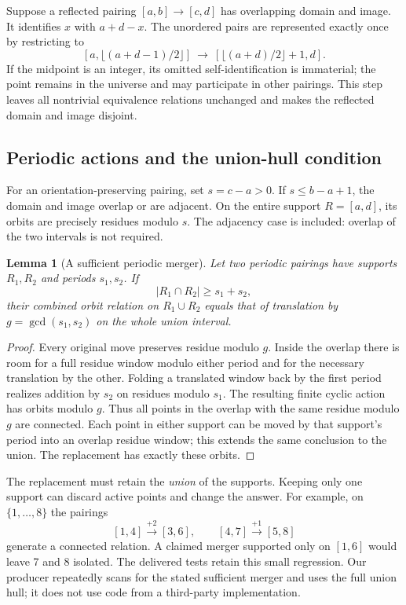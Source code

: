 \documentclass[11pt,a4paper]{article}
\newtheorem{lemma}[theorem]{Lemma}
\theoremstyle{definition}\newtheorem{definition}[theorem]{Definition}
\theoremstyle{remark}\newtheorem{remark}[theorem]{Remark}
\begin{document}
Suppose a reflected pairing $[a,b]\to[c,d]$ has overlapping domain and image.
It identifies $x$ with $a+d-x$. The unordered pairs are represented exactly
once by restricting to
\[
 [a,\lfloor(a+d-1)/2\rfloor]
 \ \longrightarrow\
 [\lfloor(a+d)/2\rfloor+1,d].
\]
If the midpoint is an integer, its omitted self-identification is immaterial;
the point remains in the universe and may participate in other pairings.
This step leaves all nontrivial equivalence relations unchanged and makes
the reflected domain and image disjoint.

\subsection{Periodic actions and the union-hull condition}

For an orientation-preserving pairing, set $s=c-a>0$. If
$s\leq b-a+1$, the domain and image overlap or are adjacent. On the entire
support $R=[a,d]$, its orbits are precisely residues modulo $s$. The adjacency
case is included: overlap of the two intervals is not required.

\begin{lemma}[A sufficient periodic merger]
Let two periodic pairings have supports $R_1,R_2$ and periods $s_1,s_2$.
If
\[
 |R_1\cap R_2|\geq s_1+s_2,
\]
their combined orbit relation on $R_1\cup R_2$ equals that of translation by
$g=\gcd(s_1,s_2)$ on the whole union interval.
\end{lemma}
\begin{proof}
Every original move preserves residue modulo $g$. Inside the overlap there
is room for a full residue window modulo either period and for the necessary
translation by the other. Folding a translated window back by the first
period realizes addition by $s_2$ on residues modulo $s_1$. The resulting
finite cyclic action has orbits modulo $g$. Thus all points in the overlap
with the same residue modulo $g$ are connected. Each point in either support
can be moved by that support's period into an overlap residue window; this
extends the same conclusion to the union. The replacement has exactly these
orbits.
\end{proof}

The replacement must retain the \emph{union} of the supports. Keeping only
one support can discard active points and change the answer. For example,
on $\{1,\ldots,8\}$ the pairings
\[
 [1,4]\xrightarrow{+2}[3,6],\qquad
 [4,7]\xrightarrow{+1}[5,8]
\]
generate a connected relation. A claimed merger supported only on $[1,6]$
would leave 7 and 8 isolated. The delivered tests retain this small regression.
Our producer repeatedly scans for the stated sufficient merger and uses
the full union hull; it does not use code from a third-party implementation.
\end{document}
